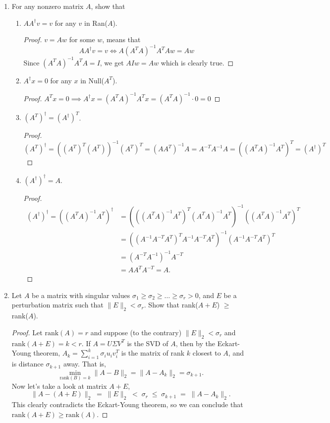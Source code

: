 \documentclass[11pt]{article}
\begin{document}
\begin{enumerate}
	\item For any nonzero matrix \(A\), show that
	      \begin{enumerate}
		      \item \(AA^\dag v = v\) for any \(v\) in Ran(\(A\)).
            \begin{proof}
              \(v = Aw\) for some \(w\), means that
              \[A A^\dag v = v \iff A (A^T A)^{-1} A^T A w = Aw\]
              Since \((A^T A)^{-1} A^T A = I\), we get \(AIw = Aw\) which is clearly true.
            \end{proof}
		      \item \(A^\dag x = 0\) for any \(x\) in Null(\(A^T\)).
            \begin{proof}
              \(A^T x = 0 \implies A^\dag x = (A^T A)^{-1} A^T x = (A^T A)^{-1} \cdot 0 = 0\)
            \end{proof}
		      \item \((A^T)^\dag = (A^\dag)^T\).
            \begin{proof}
              \((A^T)^\dag = ((A^T)^T (A^T))^{-1} (A^T)^T = (A A^T)^{-1} A = A^{-T}A^{-1}A = ((A^T A)^{-1} A^T)^T = (A^\dag)^T\)
            \end{proof}
		      \item \((A^\dag)^\dag = A\).
            \begin{proof} \begin{align*}
                (A^\dag)^\dag = ((A^T A)^{-1} A^T)^\dag &= (((A^T A)^{-1} A^T)^T (A^T A)^{-1} A^T)^{-1} ((A^T A)^{-1} A^T)^T \\
                &= ((A^{-1} A^{-T} A^T)^T A^{-1} A^{-T} A^T)^{-1} (A^{-1} A^{-T} A^T)^T \\
                &= (A^{-T} A^{-1})^{-1} A^{-T} \\
                &= A A^T A^{-T} = A.
              \end{align*}
            \end{proof}
	      \end{enumerate}

	\item Let \(A\) be a matrix with singular values \(\sigma_1 \geq \sigma_2 \geq \dots \geq \sigma_r > 0\), and \(E\) be a perturbation matrix such that \(\lVert E \rVert_2 < \sigma_r\).  Show that rank(\(A+E\)) \(\geq\) rank(\(A\)).
    \begin{proof}
      Let \(\text{rank}(A) = r\) and suppose (to the contrary) \(\lVert E \rVert_2 < \sigma_r\) and \(\text{rank}(A+E) = k < r\).  If \(A = U \Sigma V^T\) is the SVD of \(A\), then by the Eckart-Young theorem, \(A_k = \sum_{i=1}^k \sigma_i u_i v_i^T\) is the matrix of rank \(k\) closest to \(A\), and is distance \(\sigma_{k+1}\) away.  That is,
      \[\min_{\text{rank}(B) = k} \lVert A - B \rVert_2 = \lVert A - A_k \rVert_2 = \sigma_{k+1}.\]
      Now let's take a look at matrix \(A+E\),
      \[\lVert A - (A+E) \rVert_2 \;=\; \lVert E \rVert_2 \;<\; \sigma_r \;\leq\; \sigma_{k+1} \;=\; \lVert A - A_k \rVert_2.\]
      This clearly contradicts the Eckart-Young theorem, so we can conclude that \(\text{rank}(A+E) \geq \text{rank}(A)\).
    \end{proof}


\end{enumerate}
\end{document}
